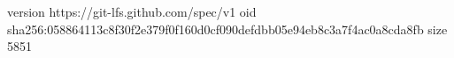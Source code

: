 version https://git-lfs.github.com/spec/v1
oid sha256:058864113c8f30f2e379f0f160d0cf090defdbb05e94eb8c3a7f4ac0a8cda8fb
size 5851
